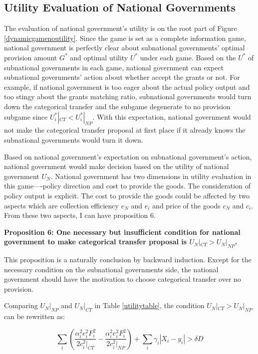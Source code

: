 \begin{itemize}
\subsection{Utility Evaluation of National Governments}

The evaluation of national government's utility is on the root part of Figure \ref{dynamicgamenoutility}. Since the game is set as a complete information game, national government is perfectly clear about subnational governments' optimal provision amount $G^*$ and optimal utility $U^*$ under each game. Based on the $U^*$ of subnational governments in each game, national government can expect subnational governments' action about whether accept the grants or not. For example, if national government is too eager about the actual policy output and too stingy about the grants matching ratio, subnational governments would turn down the categorical transfer and the subgame degenerate to no provision subgame since $U_i^*|_{CT}< U_i^*|_{NP}$. With this expectation, national government would not make the categorical transfer proposal at first place if it already knows the subnational governments would turn it down.

Based on national government's expectation on subnational government's action, national government would make decision based on the utility of national government $U_N$. National government has two dimensions in utility evaluation in this game----policy direction and cost to provide the goods. The consideration of policy output is explicit. The cost to provide the goods could be affected by two aspects which are collection efficiency $e_N$ and $e_i$ and price of the goods $c_N$ and $c_i$. From these two aspects, I can have proposition 6.

\textbf{Proposition 6: One necessary but insufficient condition for national government to make categorical transfer proposal is $U_N|_{CT} > U_N|_{NP}$.}

This proposition is a naturally conclusion by backward induction. Except for the necessary condition on the subnational governments side, the national government should have the motivation to choose categorical transfer over no provision.

Comparing $U_N|_{NP}$ and $U_N|_{CT}$ in Table \ref{utilitytable}, the condition $U_N|_{CT} > U_N|_{NP}$ can be rewritten as:

\begin{equation}
  \sum_i(\frac{\alpha_i^2e_i^2F_i^2}{2c_i^2|_{CT}}-\frac{\alpha_i^2e_i^2F_i^2}{2c_i^2|_{NP}}) +\sum_i\gamma_i|X_i-y_i|>\delta D
\end{equation}


\end{itemize}
